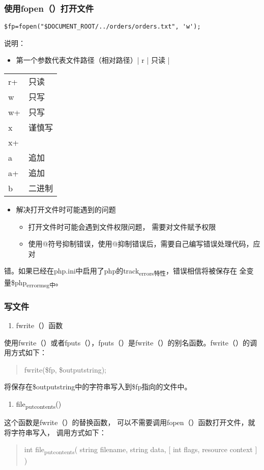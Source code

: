 \documentclass[11pt]{article}
\begin{document}
\subsubsection{使用fopen（）打开文件}
\label{sec:org6c6fd7a}
\begin{verbatim}
$fp=fopen("$DOCUMENT_ROOT/../orders/orders.txt", 'w');
\end{verbatim}
说明：
\begin{itemize}
\item 第一个参数代表文件路径（相对路径）| r    | 只读     |
\end{itemize}
\begin{center}
\begin{tabular}{ll}
r+ & 只读\\
w & 只写\\
w+ & 只写\\
x & 谨慎写\\
x+ & \\
a & 追加\\
a+ & 追加\\
b & 二进制\\
\end{tabular}
\end{center}
\begin{itemize}
\item 解决打开文件时可能遇到的问题
\begin{itemize}
\item 打开文件时可能会遇到文件权限问题， 需要对文件赋予权限
\item 使用@符号抑制错误，使用@抑制错误后，需要自己编写错误处理代码，应对
\end{itemize}
\end{itemize}
错。如果已经在php.ini中启用了php的track\textsubscript{errors特性}，错误相信将被保存在
全变量\$php\textsubscript{errormsg中}。
\subsubsection{写文件}
\label{sec:orgf0d79f0}
\begin{enumerate}
\item fwrite（）函数
\end{enumerate}
使用fwrite（）或者fputs（），fputs（）是fwrite（）的别名函数。fwrite（）的调用方式如下：
\begin{quote}
fwrite(\$fp, \$outputstring);
\end{quote}
将保存在\$outputstring中的字符串写入到\$fp指向的文件中。

\begin{enumerate}
\item file\textsubscript{put}\textsubscript{contents}()
\end{enumerate}
这个函数是fwrite（）的替换函数， 可以不需要调用fopen（）函数打开文件，就将字符串写入， 调用方式如下：
\begin{quote}
int file\textsubscript{put}\textsubscript{contents}( string filename,
                             string data,
                             [ int flags,
                               resource context ]
                             )
\end{quote}
\end{document}
